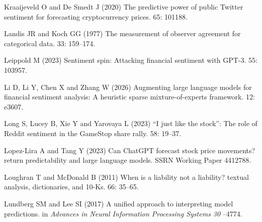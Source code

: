 \documentclass{aims}
\numberwithin{equation}{section}
\begin{document}
\begin{thebibliography}{}
\newblock Kraaijeveld O and De Smedt J (2020)
\newblock The predictive power of public {Twitter} sentiment for forecasting
  cryptocurrency prices.
 65: 101188. 

\newblock Landis JR and Koch GG (1977)
\newblock The measurement of observer agreement for categorical data.
 33: 159--174. 

\newblock Leippold M (2023)
\newblock Sentiment spin: Attacking financial sentiment with {GPT-3}.
 55: 103957. 

\newblock Li D, Li Y, Chen X and Zhang W (2026)
\newblock Augmenting large language models for financial sentiment analysis: A
  heuristic sparse mixture-of-experts framework.
 12: e3607. 

\newblock Long S, Lucey B, Xie Y and Yarovaya L (2023)
\newblock ``{I} just like the stock'': The role of {Reddit} sentiment in the
  {GameStop} share rally.
 58: 19--37. 

\newblock Lopez-Lira A and Tang Y (2023)
\newblock Can {ChatGPT} forecast stock price movements? return predictability
  and large language models.
\newblock SSRN Working Paper 4412788. 

\newblock Loughran T and McDonald B (2011)
\newblock When is a liability not a liability? textual analysis, dictionaries,
  and 10-{K}s.
 66: 35--65. 

\newblock Lundberg SM and Lee SI (2017)
\newblock A unified approach to interpreting model predictions.
\newblock in {\em Advances in Neural Information Processing Systems 30}
--4774.  


\end{thebibliography}
\end{document}
